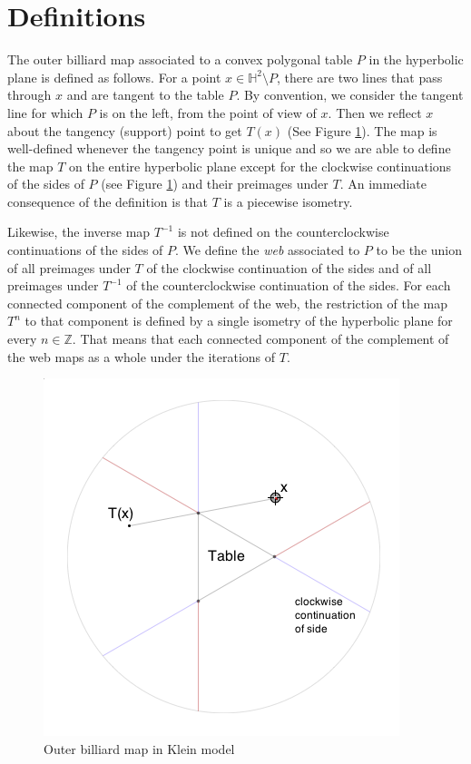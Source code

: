 \documentclass[11pt, oneside]{article}   	%
\begin{document}
\section{Definitions}
\indent \indent The outer billiard map associated to a convex polygonal table $P$ in the hyperbolic plane is defined as follows. For a point $x\in\mathbb{H}^2\setminus P$, there are two lines that pass through $x$ and are tangent to the table $P$. By convention, we consider the tangent line for which $P$ is on the left, from the point of view of $x$. Then we reflect $x$ about the tangency (support) point to get $T(x)$ (See Figure \ref{definition}).  The map is well-defined whenever the tangency point is unique and so we are able to define the map $T$ on the entire hyperbolic plane except for the clockwise continuations of the sides of $P$ (see Figure \ref{definition}) and their preimages under $T$.  An immediate consequence of the definition is that $T$ is a piecewise isometry. %

Likewise, the inverse map $T^{-1}$ is not defined on the counterclockwise continuations of the sides of $P$.
We define the \textit{web} associated to $P$ to be the union of all preimages under $T$ of the clockwise continuation of the sides and of all preimages under $T^{-1}$ of the counterclockwise continuation of the sides. For each connected component of the complement of the web, the restriction of the map $T^n$ to that component is defined by a single isometry of the hyperbolic plane for every $n\in {\mathbb Z}$.  That means that each connected component of the complement of the web  maps as a whole under the iterations of $T$.
\begin{figure}
\centering
\includegraphics[scale=0.6]{Tablewithcontinuations.png}
\caption{Outer billiard map in Klein model}
\label{definition}
\end{figure}
\end{document}

